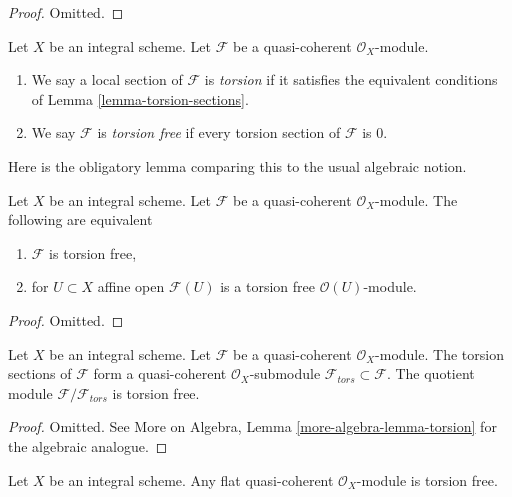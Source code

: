 \begin{proof}
Omitted.
\end{proof}

\begin{definition}
\label{definition-torsion}
Let $X$ be an integral scheme. Let $\mathcal{F}$ be a quasi-coherent
$\mathcal{O}_X$-module.
\begin{enumerate}
\item We say a local section of $\mathcal{F}$ is {\it torsion}
if it satisfies the equivalent conditions of Lemma \ref{lemma-torsion-sections}.
\item We say $\mathcal{F}$ is {\it torsion free} if every torsion section
of $\mathcal{F}$ is $0$.
\end{enumerate}
\end{definition}

\noindent
Here is the obligatory lemma comparing this to the usual algebraic notion.

\begin{lemma}
\label{lemma-check-torsion-on-affines}
Let $X$ be an integral scheme. Let $\mathcal{F}$ be a quasi-coherent
$\mathcal{O}_X$-module. The following are equivalent
\begin{enumerate}
\item $\mathcal{F}$ is torsion free,
\item for $U \subset X$ affine open $\mathcal{F}(U)$
is a torsion free $\mathcal{O}(U)$-module.
\end{enumerate}
\end{lemma}

\begin{proof}
Omitted.
\end{proof}

\begin{lemma}
\label{lemma-torsion}
Let $X$ be an integral scheme. Let $\mathcal{F}$ be a quasi-coherent
$\mathcal{O}_X$-module. The torsion sections of $\mathcal{F}$ form
a quasi-coherent $\mathcal{O}_X$-submodule
$\mathcal{F}_{tors} \subset \mathcal{F}$.
The quotient module $\mathcal{F}/\mathcal{F}_{tors}$ is torsion free.
\end{lemma}

\begin{proof}
Omitted. See More on Algebra, Lemma \ref{more-algebra-lemma-torsion}
for the algebraic analogue.
\end{proof}

\begin{lemma}
\label{lemma-flat-torsion-free}
Let $X$ be an integral scheme. Any flat quasi-coherent $\mathcal{O}_X$-module
is torsion free.
\end{lemma}

